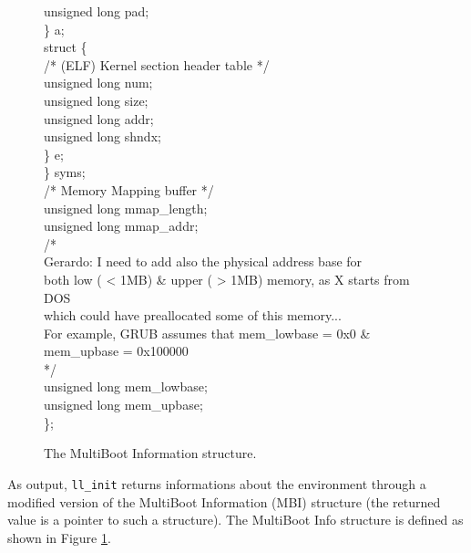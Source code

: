 \documentclass[a4paper]{report}
\begin{document}
\begin{figure}
\begin{tt}
\begin{tabbing}
\>      \>      \>      unsigned long pad;                              \\
\>      \>      \} a;                                                   \\
\>      \>      struct \{                                               \\
/* (ELF) Kernel section header table */                                 \\
\>      \>      \>      unsigned long num;                              \\
\>      \>      \>      unsigned long size;                             \\
\>      \>      \>      unsigned long addr;                             \\
\>      \>      \>      unsigned long shndx;                            \\
\>      \>      \} e;                                                   \\
\>      \} syms;                                                        \\
/* Memory Mapping buffer */                                             \\
\>      unsigned long mmap\_length;                                     \\
\>      unsigned long mmap\_addr;                                       \\
/*                                                                      \\
Gerardo: I need to add also the physical address base for               \\
both low ( < 1MB) \& upper ( > 1MB) memory, as X starts from DOS        \\
which could have preallocated some of this memory...                    \\
For example, GRUB assumes that mem\_lowbase = 0x0 \&                    \\
mem\_upbase = 0x100000                                                  \\
 */                                                                      \\
\>      unsigned long mem\_lowbase;                                     \\
\>      unsigned long mem\_upbase;                                      \\
\};                                                                     \\
\end{tabbing}
\end{tt}
\caption{The MultiBoot Information structure.}
\label{fig:MBI}
\end{figure}
As output, {\tt ll\_init} returns informations about the environment
through a modified version of the MultiBoot Information (MBI)
structure (the returned value is a pointer to such a structure). The
MultiBoot Info structure is defined as shown in Figure \ref{fig:MBI}.
\end{document}
